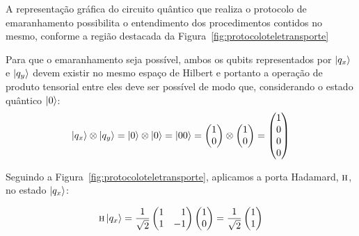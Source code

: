A representação gráfica do circuito quântico que realiza o protocolo de emaranhamento possibilita o entendimento dos procedimentos contidos no mesmo, conforme a região destacada da Figura~\ref{fig:protocoloteletransporte}

Para que o emaranhamento seja possível, ambos os qubits representados por $\ket{q_x}$ e $\ket{q_y}$ devem existir no mesmo espaço de Hilbert e portanto a operação de produto tensorial entre eles deve ser possível de modo que, considerando o estado quântico $\ket{0}$:
\begin{equation}
\ket{q_x} \otimes \ket{q_y} = \ket{0} \otimes \ket{0} = \ket{00} = \begin{pmatrix}
1 \\
0
\end{pmatrix} \otimes \begin{pmatrix}
1 \\
0
\end{pmatrix} = \begin{pmatrix}
1 \\
0 \\
0 \\
0
\end{pmatrix}
\end{equation}

Seguindo a Figura~\ref{fig:protocoloteletransporte}, aplicamos a porta Hadamard, \(\operatorname{\textsc{h}}\), no estado $\ket{q_x}$:

\begin{equation}\label{eq:Hqbit0}
\HAD \ket{q_x}= \frac{1}{\sqrt{2}} \begin{pmatrix*}[r]
1 & 1 \\
1 & -1
\end{pmatrix*} \begin{pmatrix}
1  \\
0 
\end{pmatrix} = \frac{1}{\sqrt{2}} \begin{pmatrix*}[r]
1 \\
1
\end{pmatrix*}
\end{equation}


